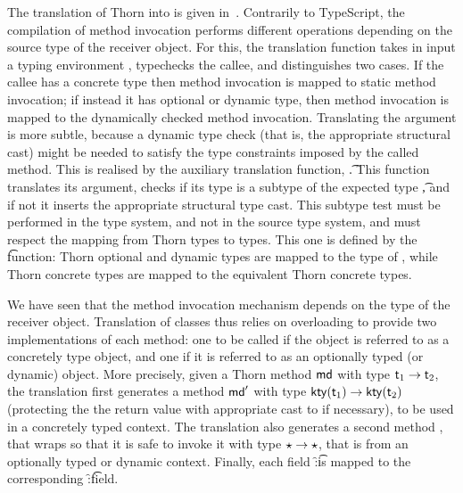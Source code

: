 \documentclass[acmlarge, anonymous, authordraft, review]{acmart} %
\begin{document}
 The translation of Thorn into \kafka is given in~.  Contrarily to TypeScript, the compilation of method invocation performs different operations depending on the source type of the receiver object. For this, the translation function \Env takes in input a typing environment \Env, typechecks the callee, and distinguishes two cases.  If the callee has a concrete type then method invocation is mapped to static method invocation; if instead it has optional or dynamic type, then method invocation is mapped to the dynamically checked method invocation.  Translating the argument is more subtle, because a dynamic type check (that is, the appropriate structural cast) might be needed to satisfy the type constraints imposed by the called method.
  This is realised by the auxiliary translation function, \Env\t.  This function translates its argument, checks if its type is a subtype of the expected type \t, and if not it inserts the appropriate structural type cast.  This subtype test must be performed in the \kafka type system, and not in the source type system, and must respect the mapping from Thorn types to \kafka types.  This one is defined by the \kty\t function: Thorn optional and dynamic types are mapped to the \any type of \kafka, while Thorn concrete types are mapped to the equivalent Thorn concrete types.
 

We have seen that the method invocation mechanism depends on the type of the receiver object. Translation of classes thus relies on overloading to provide two implementations of each method: one to be called if the object is referred to as a concretely type object, and one if it is referred to as an optionally typed (or dynamic) object.  More precisely, given a Thorn method \(\md\) with type \(\t[1] \to \t[2]\), the \kafka translation first generates a method \(\mdp\) with type \(\kty{\t[1]} \to \kty{\t[2]}\) (protecting the the return value with appropriate cast to \kty{\t[2]} if necessary), to be used in a concretely typed context.  The \kafka translation also generates a second method \mdpp, that wraps \mdp so that it is safe to invoke it with type \(\star \to \star\), that is from an optionally typed or dynamic context.  Finally, each field \f:\t is mapped to the corresponding \f:\kty\t field.

%
%
%
\end{document}
